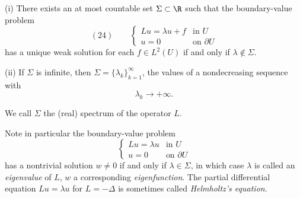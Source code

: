 \begin{theorem}
\label{thm:third-existence-spectrum}
(i) There exists an at most countable set $\Sigma \subset \R$ such that the boundary-value problem
$$(24) \qquad \begin{cases} Lu = \lambda u + f & \text{in } U \\ u = 0 & \text{on } \partial U \end{cases}$$
has a unique weak solution for each $f \in L^2(U)$ if and only if $\lambda \notin \Sigma$.

(ii) If $\Sigma$ is infinite, then $\Sigma = \{\lambda_k\}_{k=1}^\infty$, the values of a nondecreasing sequence with
$$\lambda_k \to +\infty.$$
\end{theorem}

\begin{definition}
\label{def:spectrum-of-operator}
We call $\Sigma$ the (real) spectrum of the operator $L$.
\end{definition}

\begin{remark}
\label{rem:eigenvalues-helmholtz-equation}
Note in particular the boundary-value problem
$$\begin{cases} Lu = \lambda u & \text{in } U \\ u = 0 & \text{on } \partial U \end{cases}$$
has a nontrivial solution $w \neq 0$ if and only if $\lambda \in \Sigma$, in which case $\lambda$ is called an \textit{eigenvalue} of $L$, $w$ a corresponding \textit{eigenfunction}. The partial differential equation $Lu = \lambda u$ for $L = -\Delta$ is sometimes called \textit{Helmholtz's equation}.
\end{remark}

